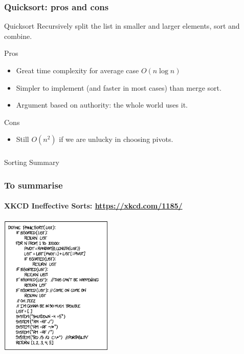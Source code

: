 \begin{frame}
	\frametitle{Quicksort: pros and cons}
	\begin{block}{Quicksort}
			Recursively split the list in smaller and larger elements, sort and combine.
		\end{block}	
		\begin{block}{Pros}
			\begin{itemize}
				\item Great time complexity for average case $O(n\log n)$
				\item Simpler to implement (and faster in most cases) than merge sort.
				\item Argument based on authority: the whole world uses it.
			\end{itemize}
		\end{block}	
		\begin{block}{Cons}
			\begin{itemize}
				\item Still $O(n^2)$ if we are unlucky in choosing pivots.
			\end{itemize}
		\end{block}	
\end{frame}

\begin{frame}[fragile]\frametitle{}
\begin{center}
{\Large Sorting Summary}
\end{center}

\end{frame}

\begin{frame}
	\frametitle{To summarise}
	\framesubtitle{XKCD Ineffective Sorts: \url{https://xkcd.com/1185/}}
	\begin{center}
		\includegraphics[width=0.4\textwidth]{images/panicsort.png}\\
	\end{center}
\end{frame}
	
